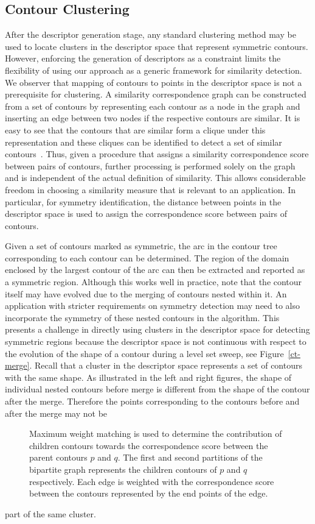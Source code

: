 \documentclass[review,journal]{vgtc}         %
\begin{document}
\subsection{Contour Clustering}
After the descriptor generation stage, any standard clustering method may be used to
locate clusters in the descriptor space that represent symmetric contours. However,
enforcing the generation of descriptors as a constraint limits the flexibility of 
using our approach as a generic framework for similarity detection. We observer that mapping of
contours to points in the
descriptor space is not a prerequisite for clustering. A similarity correspondence
graph can be constructed from a set of contours by representing each contour
as a node in the graph and inserting an edge between two nodes if the respective
contours are similar. It is easy to see that the contours that are similar form
a clique under this representation and these cliques can be identified to detect
a set of similar contours~\cite{Lip10}. Thus, given a procedure that assigns a similarity 
correspondence score between pairs of contours, further processing is performed 
solely on the graph and is independent of the actual definition of similarity.
This allows considerable freedom in choosing a similarity measure that is relevant to an application.
In particular, for symmetry identification, the distance between points in the descriptor space is
used to assign the correspondence score between pairs of contours. 

Given a set of contours marked as symmetric, the arc in the contour tree 
corresponding to each contour can be determined. The region of the domain
enclosed by the largest contour of the arc can then be extracted and reported
as a symmetric region. Although this works well in practice, note that the contour
itself may have evolved due to the merging of contours nested within it.
An application with stricter requirements on symmetry detection may need to
also incorporate the symmetry of these nested contours in the algorithm. 
This presents a challenge in directly using clusters in the descriptor space 
for detecting symmetric regions because the descriptor space is not continuous with 
respect to the evolution of the shape of a contour during a level set sweep, 
see Figure~\ref{ct-merge}. Recall that a cluster in the descriptor space represents a
set of contours with the same shape. As illustrated in the left and right
figures, the shape of individual nested contours
before merge is different from the shape of the contour after the merge.
Therefore the points corresponding to the contours before and after the merge may not be
\begin{figure}[h]
\centering
\caption{\label{bip}Maximum weight matching is used to determine the contribution of children
	contours towards the correspondence score between the parent contours $p$ and $q$. The
	first and second partitions of the bipartite graph represents the children contours of $p$
	and $q$ respectively. Each edge is weighted with the correspondence score between the
	contours represented by the end points of the edge.}
\end{figure}
part of the same cluster. 
\end{document}
